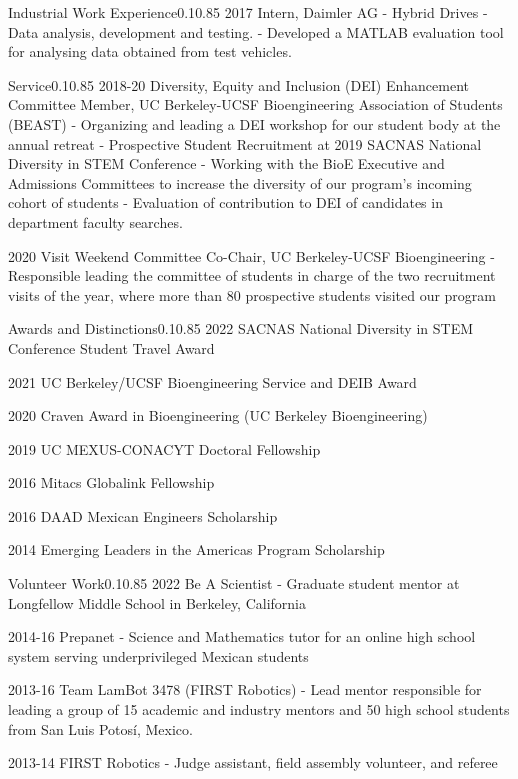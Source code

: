 \documentclass{federico_cv}
\begin{document}
\begin{tblSection}{Industrial Work Experience}{0.1}{0.85}
\leftbfrightsingle
{2017}
{Intern, Daimler AG}
{- Hybrid Drives - Data analysis, development and testing.}
{- Developed a MATLAB evaluation tool for analysing data obtained from test vehicles.}

\end{tblSection}


\begin{tblSection}{Service}{0.1}{0.85}
\leftbfrightsingle
{2018-20}
{Diversity, Equity and Inclusion (DEI) Enhancement Committee Member, UC Berkeley-UCSF Bioengineering Association of Students (BEAST)}
{- Organizing and leading a DEI workshop for our student body at the annual retreat}
{- Prospective Student Recruitment at 2019 SACNAS National Diversity in STEM Conference}
{- Working with the BioE Executive and Admissions Committees to increase the diversity of our program's incoming cohort of students}
{- Evaluation of contribution to DEI of candidates in department faculty searches.}

\leftbfrightsingle
{2020}
{Visit Weekend Committee Co-Chair, UC Berkeley-UCSF Bioengineering}
{- Responsible leading the committee of students in charge of the two recruitment visits of the year, where more than 80 prospective students visited our program}

\end{tblSection}


\begin{tblSection}{Awards and Distinctions}{0.1}{0.85}
\award
{2022}
{SACNAS National Diversity in STEM Conference Student Travel Award}

\award
{2021}
{UC Berkeley/UCSF Bioengineering Service and DEIB Award}

\award
{2020}
{Craven Award in Bioengineering (UC Berkeley Bioengineering)}

\award
{2019}
{UC MEXUS-CONACYT Doctoral Fellowship}

\award
{2016}
{Mitacs Globalink Fellowship}

\award
{2016}
{DAAD Mexican Engineers Scholarship}

\award
{2014}
{Emerging Leaders in the Americas Program Scholarship}

\end{tblSection}


\begin{tblSection}{Volunteer Work}{0.1}{0.85}
\job
{2022}
{Be A Scientist}
{- Graduate student mentor at Longfellow Middle School in Berkeley, California}

\job
{2014-16}
{Prepanet}
{- Science and Mathematics tutor for an online high school system serving underprivileged Mexican students}

\job
{2013-16}
{Team LamBot 3478 (FIRST Robotics)}
{- Lead mentor responsible for leading a group of 15 academic and industry mentors and 50 high school students from San Luis Potosí, Mexico.}

\job
{2013-14}
{FIRST Robotics}
{- Judge assistant, field assembly volunteer, and referee}

\end{tblSection}
\end{document}
